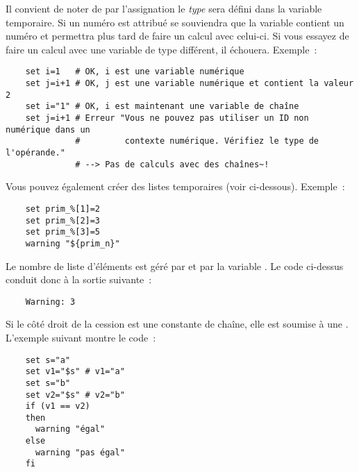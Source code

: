     Il convient de noter de par l'assignation le \emph{type} sera défini dans la variable
	temporaire. Si un numéro est attribué  se \og{}souviendra\fg{} que la
	variable contient un numéro et permettra plus tard de faire un calcul avec celui-ci.
	Si vous essayez de faire un calcul avec une variable de type différent, il échouera.
	Exemple~:

\begin{example}
\begin{verbatim}
    set i=1   # OK, i est une variable numérique
    set j=i+1 # OK, j est une variable numérique et contient la valeur 2
    set i="1" # OK, i est maintenant une variable de chaîne
    set j=i+1 # Erreur "Vous ne pouvez pas utiliser un ID non numérique dans un
              #         contexte numérique. Vérifiez le type de l'opérande."
              # --> Pas de calculs avec des chaînes~!
\end{verbatim}
\end{example}

    Vous pouvez également créer des listes temporaires (voir ci-dessous). Exemple~:

\begin{example}
\begin{verbatim}
    set prim_%[1]=2
    set prim_%[2]=3
    set prim_%[3]=5
    warning "${prim_n}"
\end{verbatim}
\end{example}

    Le nombre de liste d'éléments est géré par  et par la variable
	. Le code ci-dessus conduit donc à la sortie suivante~:

\begin{example}
\begin{verbatim}
    Warning: 3
\end{verbatim}
\end{example}

    Si le côté droit de la cession est une constante de chaîne, elle est soumise à une
	. L'exemple
	suivant montre le code~:

\begin{example}
\begin{verbatim}
    set s="a"
    set v1="$s" # v1="a"
    set s="b"
    set v2="$s" # v2="b"
    if (v1 == v2)
    then
      warning "égal"
    else
      warning "pas égal"
    fi
\end{verbatim}
\end{example}


